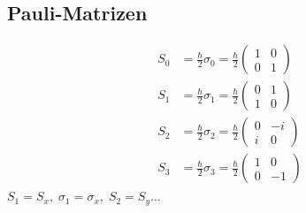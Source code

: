 \documentclass[landscape,8pt]{scrartcl}
\begin{document}
\begin{multicols}{3}
\subsection{Pauli-Matrizen}
\begin{align*}
S_0 &= \frac{\hbar}{2}\sigma_0 = \frac{\hbar}{2} \begin{pmatrix}1&0\\0&1\end{pmatrix}	\\
S_1 &= \frac{\hbar}{2}\sigma_1 = \frac{\hbar}{2} \begin{pmatrix}0&1\\1&0\end{pmatrix}	\\
S_2 &= \frac{\hbar}{2}\sigma_2 = \frac{\hbar}{2} \begin{pmatrix}0&-i\\i&0\end{pmatrix}	\\
S_3 &= \frac{\hbar}{2}\sigma_3 = \frac{\hbar}{2} \begin{pmatrix}1&0\\0&-1\end{pmatrix}	\\
\end{align*}
$S_1 = S_x, \; \sigma_1 = \sigma_x, \; S_2 = S_y \dots$

\end{multicols}
\end{document}
